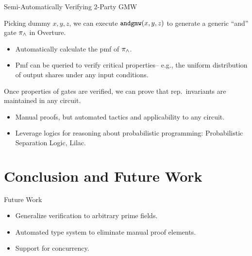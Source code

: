 \documentclass{beamer}
\begin{document}
\begin{frame}
  
  \begin{exampleblock}{Semi-Automatically Verifying 2-Party GMW}

    Picking dummy $x,y,z$, we can execute $\texttt{andgmw}(x,y,z)$
    to generate a generic ``and'' gate $\pi_{\wedge}$ in Overture.
    \begin{itemize}
    \item Automatically calculate the pmf of $\pi_{\wedge}$.
    \item Pmf can be queried to verify critical properties-- e.g., the
      uniform distribution of output shares under any input conditions. 
    \end{itemize}
    Once properties of gates are verified, we can prove that rep.~invariants
    are maintained in any circuit.
    \begin{itemize}
    \item Manual proofs, but automated tactics and applicability to any circuit.
    \item Leverage logics for reasoning about probabilistic programming: Probabilistic
      Separation Logic, Lilac.
    \end{itemize}
 
  \end{exampleblock}
  
\end{frame}

\section{Conclusion and Future Work}


\begin{frame}{Future Work}

  \begin{itemize}
  \item Generalize verification to arbitrary prime fields.
  \item Automated type system to eliminate manual proof elements.
  \item Support for concurrency.
  \end{itemize}

\end{frame}
\end{document}
